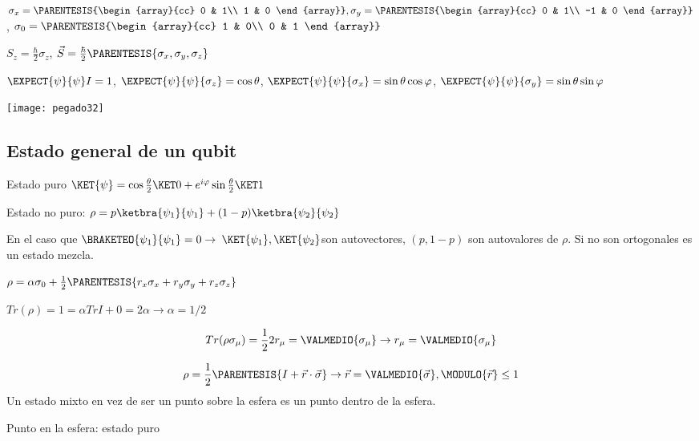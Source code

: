 $\sigma_{x}=\PARENTESIS{\begin{array}{cc}
0 & 1\\
1 & 0
\end{array}},\sigma_{y}=\PARENTESIS{\begin{array}{cc}
0 & 1\\
-1 & 0
\end{array}}$, $\sigma_{0}=\PARENTESIS{\begin{array}{cc}
1 & 0\\
0 & 1
\end{array}}$

$S_{z}=\frac{\hbar}{2}\sigma_{z}$, $\vec{S}=\frac{\hbar}{2}\PARENTESIS{\sigma_{x},\sigma_{y},\sigma_{z}}$

$\EXPECT{\psi}{\psi}I=1$, $\EXPECT{\psi}{\psi}{\sigma_{z}}=\cos\theta$,
$\EXPECT{\psi}{\psi}{\sigma_{x}}=\sin\theta\cos\varphi$, $\EXPECT{\psi}{\psi}{\sigma_{y}}=\sin\theta\sin\varphi$
\begin{center}
\texttt{[image: pegado32]}
\par\end{center}

\subsection{Estado general de un qubit}

Estado puro $\KET{\psi}=\cos\frac{\theta}{2}\KET 0+e^{i\varphi}\sin\frac{\theta}{2}\KET 1$

Estado no puro: $\rho=p\ketbra{\psi_{1}}{\psi_{1}}+(1-p)\ketbra{\psi_{2}}{\psi_{2}}$

En el caso que $\BRAKETEO{\psi_{1}}{\psi_{1}}=0\rightarrow$ $\KET{\psi_{1}},\KET{\psi_{2}}$son
autovectores, $(p,1-p)$ son autovalores de $\rho$. Si no son ortogonales
es un estado mezcla.

$\rho=\alpha\sigma_{0}+\frac{1}{2}\PARENTESIS{r_{x}\sigma_{x}+r_{y}\sigma_{y}+r_{z}\sigma_{z}}$

$Tr(\rho)=1=\alpha TrI+0=2\alpha\rightarrow\alpha=1/2$

\[
Tr(\rho\sigma_{\mu})=\frac{1}{2}2r_{\mu}=\VALMEDIO{\sigma_{\mu}}\rightarrow r_{\mu}=\VALMEDIO{\sigma_{\mu}}
\]

\[
\rho=\frac{1}{2}\PARENTESIS{I+\vec{r}\cdot\vec{\sigma}}\rightarrow\vec{r}=\VALMEDIO{\vec{\sigma}},\MODULO{\vec{r}}\leq1
\]
Un estado mixto en vez de ser un punto sobre la esfera es un punto
dentro de la esfera.

Punto en la esfera: estado puro

